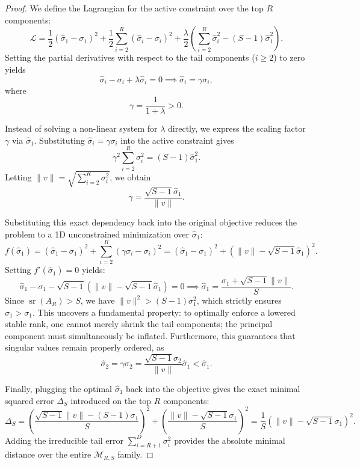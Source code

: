 \documentclass[a4paper,14pt]{extarticle}
\DeclareMathOperator{\sr}{sr}
\begin{document}
\begin{proof}
        We define the Lagrangian for the active constraint over the top $R$ components:
        \[ \mathcal{L} = \frac{1}{2}(\hat{\sigma}_1 - \sigma_1)^2 + \frac{1}{2}\sum_{i=2}^R (\hat{\sigma}_i - \sigma_i)^2 + \frac{\lambda}{2} \left( \sum_{i=2}^R \hat{\sigma}_i^2 - (S-1)\hat{\sigma}_1^2 \right). \]
        Setting the partial derivatives with respect to the tail components ($i \geqslant 2$) to zero yields 
        $$\hat{\sigma}_i - \sigma_i + \lambda \hat{\sigma}_i = 0 \implies \hat{\sigma}_i = \gamma \sigma_i,$$ 
        where 
        $$\gamma = \frac{1}{1+\lambda} > 0.$$

        Instead of solving a non-linear system for $\lambda$ directly, we express the scaling factor $\gamma$ via $\hat{\sigma}_1$. Substituting $\hat{\sigma}_i = \gamma \sigma_i$ into the active constraint gives 
        $$\gamma^2 \sum_{i=2}^R \sigma_i^2 = (S-1)\hat{\sigma}_1^2.$$ 
        Letting $\|v\| = \sqrt{\sum_{i=2}^R \sigma_i^2}$, we obtain 
        $$\gamma = \frac{\sqrt{S-1}\hat{\sigma}_1}{\|v\|}.$$


        Substituting this exact dependency back into the original objective reduces the problem to a 1D unconstrained minimization over $\hat{\sigma}_1$:
        \[ f(\hat{\sigma}_1) = (\hat{\sigma}_1 - \sigma_1)^2 + \sum_{i=2}^R (\gamma \sigma_i - \sigma_i)^2 = (\hat{\sigma}_1 - \sigma_1)^2 + (\|v\| - \sqrt{S-1}\hat{\sigma}_1)^2. \]
        Setting $f'(\hat{\sigma}_1) = 0$ yields:
        \[ \hat{\sigma}_1 - \sigma_1 - \sqrt{S-1}(\|v\| - \sqrt{S-1}\hat{\sigma}_1) = 0 \implies \hat{\sigma}_1 = \frac{\sigma_1 + \sqrt{S-1}\|v\|}{S}. \]
        Since $\sr(A_R) > S$, we have $\|v\|^2 > (S-1)\sigma_1^2$, which strictly ensures $\hat{\sigma}_1 > \sigma_1$. This uncovers a fundamental property: to optimally enforce a lowered stable rank, one cannot merely shrink the tail components; the principal component must simultaneously be inflated. Furthermore, this guarantees that singular values remain properly ordered, as 
        $$\hat{\sigma}_2 = \gamma \sigma_2 = \frac{\sqrt{S-1}\sigma_2}{\|v\|}\hat{\sigma}_1 < \hat{\sigma}_1.$$

        Finally, plugging the optimal $\hat{\sigma}_1$ back into the objective gives the exact minimal squared error $\Delta_S$ introduced on the top $R$ components:
        \[ \Delta_S = \left(\frac{\sqrt{S-1}\|v\| - (S-1)\sigma_1}{S}\right)^2 + \left(\frac{\|v\| - \sqrt{S-1}\sigma_1}{S}\right)^2 = \frac{1}{S}(\|v\| - \sqrt{S-1}\sigma_1)^2. \]
        Adding the irreducible tail error $\sum_{i=R+1}^D \sigma_i^2$ provides the absolute minimal distance over the entire $\mathcal{M}_{R, S}$ family.
    \end{proof}
\end{document}
